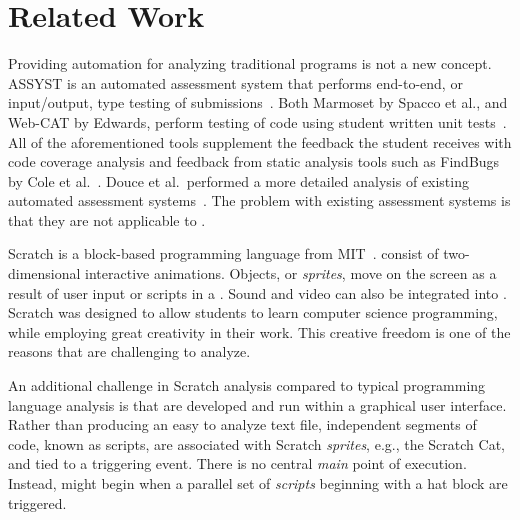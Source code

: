 \section{Related Work}

Providing automation for analyzing traditional programs is not a new concept.
ASSYST is an automated assessment system that performs end-to-end, or
input/output, type testing of
submissions~\cite{Jackson:1997:GSP:268084.268210}. Both Marmoset by Spacco et
al., and Web-CAT by Edwards, perform testing of code using student written unit
tests~\cite{Spacco:2006:EMD:1140124.1140131,
  Edwards:2003:RCS:949344.949390}. All of the aforementioned tools supplement
the feedback the student receives with code coverage analysis and feedback from
static analysis tools such as FindBugs by Cole et
al.~\cite{Cole:2006:IYS:1176617.1176667}. Douce et al.\ performed a more
detailed analysis of existing automated assessment
systems~\cite{Douce:2005:ATA:1163405.1163409}.  The problem with existing
assessment systems is that they are not applicable to .

Scratch is a block-based programming language from
MIT~\cite{Maloney:2010:SPL:1868358.1868363}.   consist of
two-dimensional interactive animations.  Objects, or \emph{sprites}, move on
the screen as a result of user input or scripts in a \sprogram{}.  Sound and
video can also be integrated into .  Scratch was designed to allow
students to learn computer science programming, while employing great
creativity in their work.  This creative freedom is one of the reasons that
 are challenging to analyze.

An additional challenge in Scratch analysis compared to typical programming
language analysis is that  are developed and run within a graphical
user interface. Rather than producing an easy to analyze text file, independent
segments of code, known as scripts, are associated with Scratch \emph{sprites},
e.g., the Scratch Cat, and tied to a triggering event.  There is no central
\emph{main} point of execution.  Instead,  might begin when a
parallel set of \emph{scripts} beginning with a \greenflag{} hat block are
triggered.

